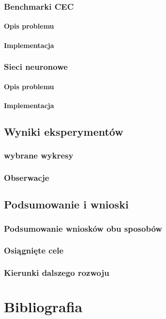 \subsection{Benchmarki CEC}
    \subsubsection*{Opis problemu}
        

\subsubsection*{Implementacja}
    

\subsection{Sieci neuronowe}
    \subsubsection*{Opis problemu}
        

\subsubsection*{Implementacja}
    

\section{Wyniki eksperymentów}
    \subsection{wybrane wykresy}
        

    \subsection{Obserwacje}
        
        

\section{Podsumowanie i wnioski}
    \subsection{Podsumowanie wniosków obu sposobów}
        

\subsection{Osiągnięte cele}
    

\subsection{Kierunki dalszego rozwoju}
    

\chapter*{Bibliografia}
    
    

